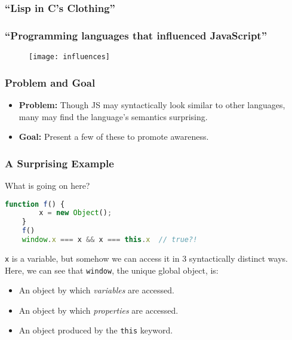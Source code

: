 \begin{frame}
    \frametitle{``Lisp in C's Clothing'' \citep{crockford2001javascript}}
\end{frame}

\begin{frame}
    \frametitle{``Programming languages that influenced JavaScript''
                \citep{rauschmayer2014speaking}}
    \begin{figure}
        \texttt{[image: influences]}
    \end{figure}
\end{frame}

\begin{frame}
    \frametitle{Problem and Goal}
    \begin{itemize}
        \item{\textbf{Problem:} Though JS may syntactically look similar to
              other languages, many may find the language's semantics
              surprising.}
        \item{\textbf{Goal:} Present a few of these to promote awareness.}
    \end{itemize}
\end{frame}

\begin{frame}[fragile]
    \frametitle{A Surprising Example}
    What is going on here?
    \begin{lstlisting}[language=JavaScript]
    function f() {
        x = new Object();
    }
    f()
    window.x === x && x === this.x  // true?!
    \end{lstlisting}
    \texttt{x} is a variable, but somehow we can access it in 3 syntactically
    distinct ways. Here, we can see that \texttt{window}, the unique global
    object, is:
    \begin{itemize}
        \item{An object by which \textit{variables} are accessed.}
        \item{An object by which \textit{properties} are accessed.}
        \item{An object produced by the \lstinline{this} keyword.}
    \end{itemize}
\end{frame}

